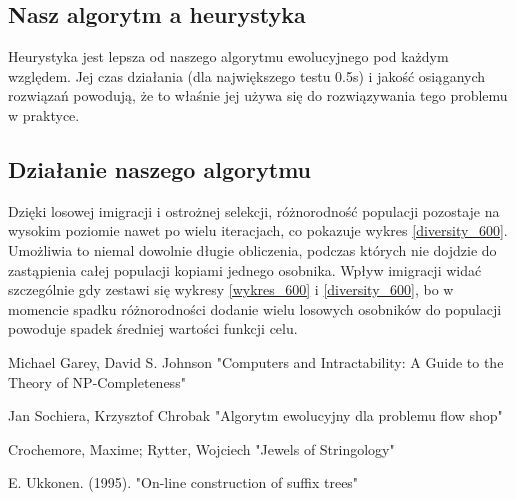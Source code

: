 \documentclass[11pt, a4wide]{mwart}
\begin{document}
\subsection{Nasz algorytm a heurystyka}
Heurystyka jest lepsza od naszego algorytmu ewolucyjnego pod każdym względem.
Jej czas działania (dla największego testu 0.5s) i jakość osiąganych rozwiązań
powodują, że to właśnie jej używa się do rozwiązywania tego problemu w praktyce.


\subsection{Działanie naszego algorytmu}
Dzięki losowej imigracji i ostrożnej selekcji, różnorodność populacji pozostaje 
na wysokim poziomie nawet po wielu iteracjach, co pokazuje wykres \ref{diversity_600}.
Umożliwia to niemal dowolnie długie obliczenia, podczas których nie dojdzie do zastąpienia
całej populacji kopiami jednego osobnika. Wpływ imigracji widać szczególnie gdy zestawi się
wykresy \ref{wykres_600} i \ref{diversity_600}, bo w momencie spadku różnorodności 
dodanie wielu losowych osobników do populacji powoduje spadek średniej wartości
funkcji celu.







\begin{thebibliography}{}
Michael Garey, David S. Johnson
"Computers and Intractability: A Guide to the Theory of NP-Completeness"

Jan Sochiera, Krzysztof Chrobak
"Algorytm ewolucyjny dla problemu flow shop"

Crochemore, Maxime; Rytter, Wojciech "Jewels of Stringology"

E. Ukkonen. (1995). "On-line construction of suffix trees"

\end{thebibliography}
\end{document}
